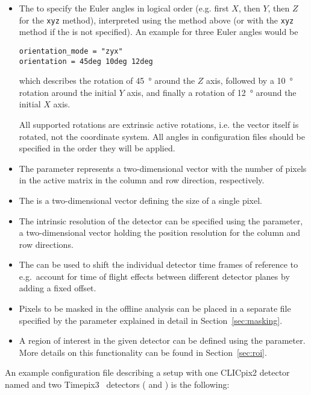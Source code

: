 \begin{itemize}
\item The  to specify the Euler angles in logical order (e.g. first $X$, then $Y$, then $Z$ for the \texttt{xyz} method), interpreted using the method above (or with the \texttt{xyz} method if the  is not specified). An example for three Euler angles would be
\begin{verbatim}
orientation_mode = "zyx"
orientation = 45deg 10deg 12deg
\end{verbatim}
which describes the rotation of \SI{45}{\degree} around the $Z$ axis, followed by a \SI{10}{\degree} rotation around the initial $Y$ axis, and finally a rotation of \SI{12}{\degree} around the initial $X$ axis.
\begin{warning}
All supported rotations are extrinsic active rotations, i.e. the vector itself is rotated, not the coordinate system. All angles in configuration files should be specified in the order they will be applied.
\end{warning}

\item The  parameter represents a two-dimensional vector with the number of pixels in the active matrix in the column and row direction, respectively.
\item The  is a two-dimensional vector defining the size of a single pixel.
\item The intrinsic resolution of the detector can be specified using the  parameter, a two-dimensional vector holding the position resolution for the column and row directions.
\item The  can be used to shift the individual detector time frames of reference to e.g.\ account for time of flight effects between different detector planes by adding a fixed offset.
\item Pixels to be masked in the offline analysis can be placed in a separate file specified by the  parameter explained in detail in Section~\ref{sec:masking}.
\item A region of interest in the given detector can be defined using the  parameter. More details on this functionality can be found in Section~\ref{sec:roi}.
\end{itemize}

An example configuration file describing a setup with one CLICpix2 detector named  and two Timepix3~\cite{timepix} detectors ( and ) is the following:

